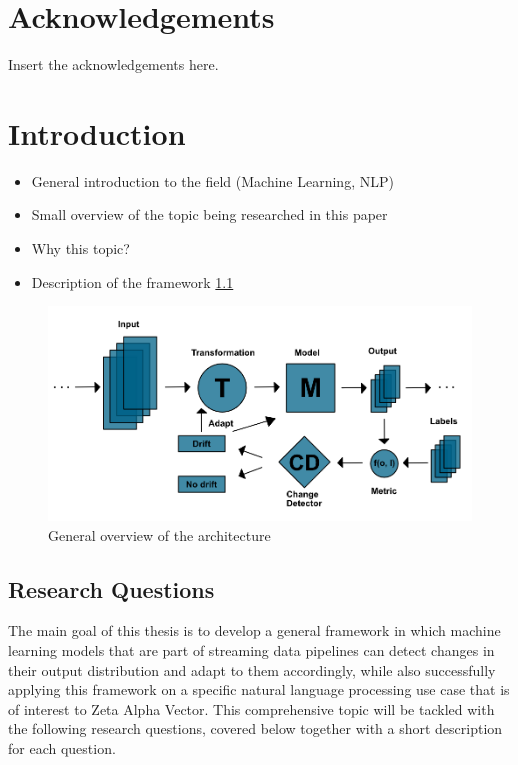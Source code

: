 \documentclass[12pt]{extreport}
\begin{document}
\chapter*{Acknowledgements}

Insert the acknowledgements here.

\tableofcontents

\listoffigures

\listoftables

\chapter{Introduction} \label{sec:intro}

\begin{itemize}
    \item General introduction to the field (Machine Learning, NLP)
    \item Small overview of the topic being researched in this paper
    \item Why this topic?
    \item Description of the framework \ref{fig:framework}
\end{itemize}

\begin{figure}[h!]
\centering
\includegraphics[width=\linewidth]{assets/introduction/framework.png}
\caption{General overview of the architecture}
\label{fig:framework}
\end{figure}

\section{Research Questions}

The main goal of this thesis is to develop a general framework in which machine learning models that are part of streaming data pipelines can detect changes in their output distribution and adapt to them accordingly, while also successfully applying this framework on a specific natural language processing use case that is of interest to Zeta Alpha Vector. This comprehensive topic will be tackled with the following research questions, covered below together with a short description for each question.
\end{document}
